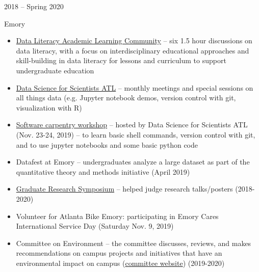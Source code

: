 \documentclass[a4paper,10pt]{article}
\newlength{\cvcolumngapwidth}
\newlength{\cvleftcolumnwidth}
\newlength{\cvrightcolumnwidth}
\newcommand{\cvtitlestyle}[1]{{\large\cvtitlefont\textcolor{cvtitlecolor}{#1}}}
\newcommand{\cvheadingstyle}[1]{{\normalsize\cvheadingfont\textcolor{cvheadingcolor}{#1}}}
\newlength{\cvafteritemskipamount}
\newlength{\cvaftertitleskipamount}
\newlength{\cvparskip}
\newcommand{\cvitem}[2]{
            \begin{minipage}[t]{\cvleftcolumnwidth}
                \raggedleft #1
            \end{minipage}%
            \hspace{\cvcolumngapwidth}%
            \begin{minipage}[t]{\cvrightcolumnwidth}
                \setlength{\parskip}{\cvparskip} #2
            \end{minipage}
        
            \vspace{\cvafteritemskipamount}
        }
\newcommand{\cvtitle}[1]{
            \cvtitlestyle{#1}
        
            \vspace{\cvaftertitleskipamount}
            \vspace{-\cvparskip}
        }
\begin{document}
                
        \cvitem{
            \cvheadingstyle{2018 -- Spring 2020}
        }{
            \cvtitle{Emory }
        
            \begin{itemize}[leftmargin=*]
            	\item \href{http://cfde.emory.edu/news-events/news/2019/november/data-literacy-alc.html}{Data Literacy Academic Learning Community} -- six 1.5 hour discussions on data literacy, with a focus on interdisciplinary educational approaches and skill-building in data literacy for lessons and curriculum to support undergraduate education
        
        	\item \href{https://data-science-for-scientists-atl.github.io/}{Data Science for Scientists ATL} -- monthly meetings and special sessions on all things data (e.g. Jupyter notebook demos, version control with git, visualization with R)
        	
        	\item \href{https://data-science-for-scientists-atl.github.io/2019-11-23-emory/}{Software carpentry workshop}  -- hosted by Data Science for Scientists ATL (Nov. 23-24, 2019) -- to learn basic shell commands, version control with git, and to use jupyter notebooks and some basic python code
        	
            	\item Datafest at Emory -- undergraduates analyze a large dataset as part of the quantitative theory and methods initiative (April 2019) 
        		
            	\item \href{http://biomed.emory.edu/news-events/events/dsac-research-symposium.html}{Graduate Research Symposium} -- helped judge research talks/posters (2018-2020) 	
        
        	\item Volunteer for Atlanta Bike Emory: participating in Emory Cares International Service Day (Saturday Nov. 9, 2019)
    	
    	    	\item Committee on Environment -- the committee discusses, reviews, and makes recommendations on campus projects and initiatives that have an environmental impact on campus (\href{https://www.senate.emory.edu/about/committees/environment.html}{committee website}) (2019-2020)
        
            \end{itemize}
        
        }
        
\end{document}

